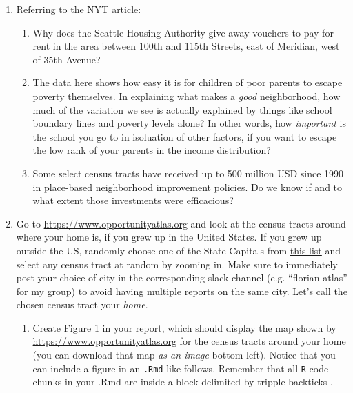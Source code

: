 \documentclass[]{book}
\begin{document}
\begin{enumerate}
\def\labelenumi{\arabic{enumi}.}
\item
  Referring to the
  \href{https://www.nytimes.com/2018/10/01/upshot/maps-neighborhoods-shape-child-poverty.html}{NYT
  article}:

  \begin{enumerate}
  \def\labelenumii{\arabic{enumii}.}
  \item
    Why does the Seattle Housing Authority give away vouchers to pay for
    rent in the area between 100th and 115th Streets, east of Meridian,
    west of 35th Avenue?
  \item
    The data here shows how easy it is for children of poor parents to
    escape poverty themselves. In explaining what makes a \emph{good}
    neighborhood, how much of the variation we see is actually explained
    by things like school boundary lines and poverty levels alone? In
    other words, how \emph{important} is the school you go to in
    isoluation of other factors, if you want to escape the low rank of
    your parents in the income distribution?
  \item
    Some select census tracts have received up to 500 million USD since
    1990 in place-based neighborhood improvement policies. Do we know if
    and to what extent those investments were efficacious?
  \end{enumerate}
\item
  Go to \url{https://www.opportunityatlas.org} and look at the census
  tracts around where your home is, if you grew up in the United States.
  If you grew up outside the US, randomly choose one of the State
  Capitals from
  \href{https://en.wikipedia.org/wiki/List_of_capitals_in_the_United_States\#State_capitals}{this
  list} and select any census tract at random by zooming in. Make sure
  to immediately post your choice of city in the corresponding slack
  channel (e.g. ``florian-atlas'' for my group) to avoid having multiple
  reports on the same city. Let's call the chosen census tract your
  \emph{home}.

  \begin{enumerate}
  \def\labelenumii{\arabic{enumii}.}
  \item
    Create Figure 1 in your report, which should display the map shown
    by \url{https://www.opportunityatlas.org} for the census tracts
    around your home (you can download that map \emph{as an image}
    bottom left). Notice that you can include a figure in an
    \texttt{.Rmd} like follows. Remember that all \texttt{R}-code chunks
    in your .Rmd are inside a block delimited by tripple backticks
    \texttt{\textasciigrave{}\textasciigrave{}\textasciigrave{}}.


\end{enumerate}
\end{enumerate}
\end{document}
